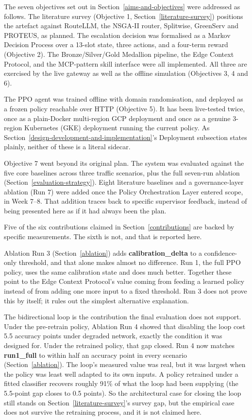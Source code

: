 The seven objectives set out in Section~\ref{aims-and-objectives} were addressed as follows.
The literature survey (Objective 1, Section~\ref{literature-survey}) positions the artefact
against RouteLLM, the NSGA-II router, Splitwise, GreenServ and PROTEUS,
as planned. The escalation decision was formalised as a Markov Decision
Process over a 13-slot state, three actions, and a four-term reward
(Objective 2). The Bronze/Silver/Gold Medallion pipeline, the Edge
Context Protocol, and the MCP-pattern skill interface were all
implemented. All three are exercised by the live gateway as well as
the offline simulation (Objectives 3, 4 and 6).

The PPO agent was trained offline with domain randomisation, and
deployed as a frozen policy reachable over HTTP (Objective 5). It has
been live-tested twice, once as a plain-Docker multi-region GCP
deployment and once as a genuine 3-region Kubernetes (GKE) deployment
running the current policy. As Section~\ref{design-development-and-implementation}'s Deployment subsection states
plainly, neither of these is a literal sidecar.

Objective 7 went beyond its original plan. The system was evaluated
against the five core baselines across three traffic scenarios, plus
the full seven-run ablation (Section~\ref{evaluation-strategy}). Eight literature baselines
and a governance-layer ablation (Run 7) were added once the Policy
Orchestration Layer entered scope, in Week 7--8. That addition traces
back to specific supervisor feedback, instead of being presented here
as if it had always been the plan.

Five of the six contributions claimed in Section~\ref{contributions} are backed by
specific measurements. The sixth is not, and that is reported here.

Ablation Run 3 (Section~\ref{ablation}) adds \textbf{calibration\_delta} to a
confidence-only threshold, and that alone makes almost no difference.
Run 1, the full PPO policy, uses the same calibration state and does
much better. Together these point to the Edge Context Protocol's value
coming from feeding a learned policy instead of from adding one more
input to a fixed threshold. Run 3 does not prove this by itself; it
rules out the simplest alternative explanation.

The bidirectional loop is the contribution the final evaluation does
not support. Under the pre-retrain policy, Ablation Run 4 showed that
disabling the loop cost 5.5 accuracy points under degraded network,
exactly the condition it was designed for. Under the retrained policy,
that gap closed. Run 4 now matches \textbf{run1\_full} to within half
an accuracy point in every scenario (Section~\ref{ablation}). The loop's measured
value was real, but it was largest when the policy was least well
adapted to its own inputs. A policy retrained under a fitted classifier
recovers roughly 91\% of what the loop had been supplying (the 5.5-point
gap closes to 0.5 points). So the
architectural case for closing the loop still stands on Section~\ref{literature-survey}'s
survey gap, but the empirical case does not survive the retraining process, and it
is not claimed here.

